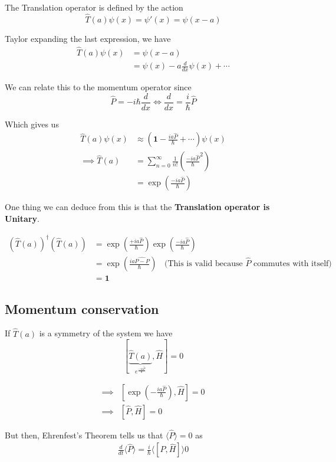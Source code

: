 \documentclass{article}
\newcommand{\mean}[1]{\langle #1 \rangle}
\begin{document}
\vskip 0.5cm
The Translation operator is defined by the action
\[ \hat{T}(a) \psi(x) = \psi'(x) = \psi(x - a) \]

Taylor expanding the last expression, we have 
\begin{align*}
  \hat{T}(a)\psi(x) &= \psi(x - a) \\
  &= \psi(x) - a\frac{d}{dx}\psi(x) + \cdots
\end{align*}

We can relate this to the momentum operator since 
\[ \hat{P} = -i\hbar\frac{d}{dx} \iff \frac{d}{dx} = \frac{i}{\hbar}\hat{P} \]

Which gives us 
\begin{align*}
  \hat{T}(a) \psi(x) &\approx \left( \mathbf{1} - \frac{ia\hat{P}}{\hbar} + \cdots \right)\psi(x) \\
  \implies \hat{T}(a) &= \sum_{n = 0}^{\infty} \frac{1}{n!} \left( \frac{-ia\hat{P}}{\hbar}^2 \right) \\
  &= \exp\left( \frac{-ia\hat{P}}{\hbar} \right)
\end{align*}

One thing we can deduce from this is that the \textbf{Translation operator is Unitary}.

\begin{dottedbox}
  \begin{align*}
    (\hat{T}(a))^{\dagger}(\hat{T}(a)) &= \exp\left( \frac{+ia\hat{P}}{\hbar} \right)\exp\left( \frac{-ia\hat{P}}{\hbar} \right) \\
    &= \exp\left( \frac{ia\hat{P - P}}{\hbar} \right) \;\;\text{ (This is valid because $\hat{P}$ commutes with itself)}\\
    &= \mathbf{1}
  \end{align*}
\end{dottedbox}

\vskip 1cm
\subsection{Momentum conservation}
If $\hat{T}(a)$ is a symmetry of the system we have 
\[ [\underbrace{\hat{T}(a)}_{e^{\frac{-ia\hat{P}}{\hbar}}}, \hat{H}] = 0 \] 

\begin{align*}
  \implies& \left[ \exp\left( -\frac{ia \hat{P}}{\hbar} \right), \hat{H} \right] = 0 \\
  \implies& \left[ \hat{P}, \hat{H} \right] = 0
\end{align*}

But then, Ehrenfest's Theorem tells us that $\mean{\hat{P}} = 0$ as  
\begin{align*}
  \frac{d}{dt}\mean{\hat{P}} = \frac{i}{\hbar} \mean{\left[ \hat{P}, \hat{H} \right]}  0
\end{align*}
\end{document}
